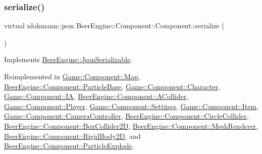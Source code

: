\subsubsection{\texorpdfstring{serialize()}{serialize()}}
{\footnotesize\ttfamily virtual nlohmann\+::json Beer\+Engine\+::\+Component\+::\+Component\+::serialize (\begin{DoxyParamCaption}{ }\end{DoxyParamCaption})\hspace{0.3cm}{\ttfamily [virtual]}}



Implements \mbox{\hyperlink{class_beer_engine_1_1_json_serializable_a17689cbd8fe282c570bd026cc1be5b3b}{Beer\+Engine\+::\+Json\+Serializable}}.



Reimplemented in \mbox{\hyperlink{class_game_1_1_component_1_1_map_a220f971266cc2b3c5f7b6a10639ec8e6}{Game\+::\+Component\+::\+Map}}, \mbox{\hyperlink{class_beer_engine_1_1_component_1_1_particle_base_ac4ab484a5ef468cbb69cccdf39e6d9a8}{Beer\+Engine\+::\+Component\+::\+Particle\+Base}}, \mbox{\hyperlink{class_game_1_1_component_1_1_character_a4f77e3bf02c40339350f47626d57dad8}{Game\+::\+Component\+::\+Character}}, \mbox{\hyperlink{class_game_1_1_component_1_1_i_a_a3d5af6c25e457a246fac8cbd63764223}{Game\+::\+Component\+::\+IA}}, \mbox{\hyperlink{class_beer_engine_1_1_component_1_1_a_collider_aecc5eb364d52beede07428ba1b668e09}{Beer\+Engine\+::\+Component\+::\+A\+Collider}}, \mbox{\hyperlink{class_game_1_1_component_1_1_player_a164f1424c0ff3d603ee60301e0aee6a7}{Game\+::\+Component\+::\+Player}}, \mbox{\hyperlink{class_game_1_1_component_1_1_settings_a1e378dbe2c0c7a198eae234e5979e91f}{Game\+::\+Component\+::\+Settings}}, \mbox{\hyperlink{class_game_1_1_component_1_1_item_a8aae88fd10b852e81fbaa16b5912a4ab}{Game\+::\+Component\+::\+Item}}, \mbox{\hyperlink{class_game_1_1_component_1_1_camera_controller_a1a7f36bf3f1f25b0edd404146f0c3289}{Game\+::\+Component\+::\+Camera\+Controller}}, \mbox{\hyperlink{class_beer_engine_1_1_component_1_1_circle_collider_a9898927635bb575aa2895cc5516433fc}{Beer\+Engine\+::\+Component\+::\+Circle\+Collider}}, \mbox{\hyperlink{class_beer_engine_1_1_component_1_1_box_collider2_d_a9172319becb9c609206265378ad04724}{Beer\+Engine\+::\+Component\+::\+Box\+Collider2D}}, \mbox{\hyperlink{class_beer_engine_1_1_component_1_1_mesh_renderer_a65c6c22ae40b5b94f590c3a8bf14d0d0}{Beer\+Engine\+::\+Component\+::\+Mesh\+Renderer}}, \mbox{\hyperlink{class_beer_engine_1_1_component_1_1_rigid_body2_d_afd6b6d4073e564a1c536243027bb8597}{Beer\+Engine\+::\+Component\+::\+Rigid\+Body2D}}, and \mbox{\hyperlink{class_beer_engine_1_1_component_1_1_particle_explode_a194d098568efe69f8e8b62eec5863ae6}{Beer\+Engine\+::\+Component\+::\+Particle\+Explode}}.



